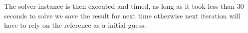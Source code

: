 The solver instance is then executed and timed, as long as it took less than 30 seconds to solve we save the result for next time
otherwise next iteration will have to rely on the reference as a initial guess.






\newpage